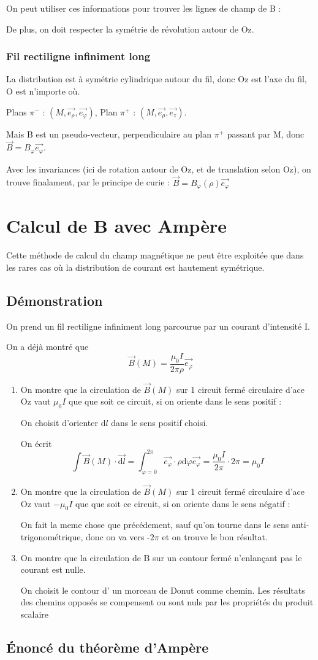 \documentclass[french]{yLectureNote}
\renewcommand{\vec}{\overrightarrow}
\newcommand{\dd}{\mathrm{d}}
\newcommand{\B}{\vec{B}(M)}
\newcommand{\er}{\vec{e_{\rho}}}
\newcommand{\ep}{\vec{e_{\varphi}}}
\newcommand{\pip}{\pi^+}
\newcommand{\pim}{\pi^-}
\begin{document}
On peut utiliser ces informations pour trouver les lignes de champ de B :

De plus, on doit respecter la symétrie de révolution autour de Oz.

\subsection{Fil rectiligne infiniment long}
La distribution est à symétrie cylindrique autour du fil, donc Oz est l'axe du fil, O est n'importe où.

Plans \(\pim\) : \((M, \er, \ep)\), Plan \(\pip\) : \((M, \er, \vec{e_z})\).

Mais B est un pseudo-vecteur, perpendiculaire au plan \(\pip\) passant par M, donc \(\vec{B} = B_{\varphi} \ep\).

Avec les invariances (ici de rotation autour de Oz, et de translation selon Oz), on trouve finalament, par le principe de curie :
\(\vec{B} = B_{\varphi}(\rho) \ep\)
\chapter{Calcul de B avec Ampère}
Cette méthode de calcul du champ magnétique ne peut \^etre exploitée que dans les rares cas où la distribution de courant est hautement symétrique.
\section{Démonstration}
On prend un fil rectiligne infiniment long parcourue par un courant d'intensité I.

On a déjà montré que \[\B = \frac{\mu_0 I}{2\pi\rho}\ep\]

\begin{enumerate}
 \item On montre que la circulation  de \(\B\) sur 1 circuit fermé circulaire d'ace Oz vaut \(\mu_0I\) que que soit ce circuit, si on oriente dans le sens positif :

 On choisit d'orienter \(\dd l\) dans le sens positif choisi.

 On écrit \[\int \B \cdot  \vec{\dd l} = \int_{\varphi = 0}^{2\pi} \ep \cdot \rho \dd \varphi \ep = \frac{\mu_0I}{2\pi}\cdot 2\pi = \mu_0I \]

 \item On montre que la circulation  de \(\B\) sur 1 circuit fermé circulaire d'ace Oz vaut \(-\mu_0I\) que que soit ce circuit, si on oriente dans le sens négatif :

 On fait la meme chose que précédement, sauf qu'on tourne dans le sens anti-trigonométrique, donc on va vers -\(2\pi\) et on trouve le bon résultat.

 \item On montre que la circulation de B sur un contour fermé n'enlançant pas le courant est nulle.

 On choisit le contour d' un morceau de Donut comme chemin. Les résultats des chemins opposés se compensent ou sont nuls par les propriétés du produit scalaire
\end{enumerate}
\section{Énoncé du théorème d'Ampère}
 
\end{document}
